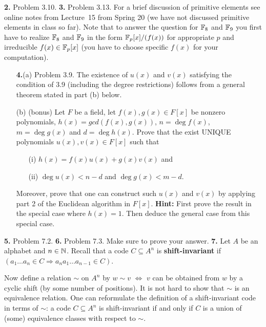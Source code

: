\documentclass[12pt]{amsart}
\begin{document}
\skv
{\bf 2.} Problem 3.10.
\skv
{\bf 3.} Problem 3.13. For a brief discussion of primitive elements see online notes from Lecture~15 from Spring 20 (we have not discussed primitive elements in class so far). Note that to answer the question for ${\mathbb F}_8$ and ${\mathbb F}_9$ you first have to realize ${\mathbb F}_8$ and ${\mathbb F}_9$ in the form ${\mathbb F}_p[x]/(f(x))$
for appropriate $p$ and irreducible $f(x)\in{\mathbb F}_p[x]$ (you have to choose specific $f(x)$ for your computation).
\skv
\begin{itemize}
\item[{\bf 4.}(a)] Problem 3.9. The existence of $u(x)$ and $v(x)$ satisfying the condition of 3.9 (including the degree restrictions) follows from a general
theorem stated in part (b) below.
\item[(b)] (bonus) Let $F$ be a field, let $f(x),g(x)\in F[x]$ be nonzero polynomials,  $h(x)=gcd(f(x),g(x))$, $n=\deg f(x)$, $m=\deg g(x)$ and
$d=\deg h(x)$. Prove that the exist UNIQUE polynomials $u(x),v(x)\in F[x]$ such that 
\begin{itemize}
\item[(i)] $h(x)=f(x)u(x)+g(x)v(x)$ and
\item[(ii)] $\deg u(x)<n-d$ and $\deg g(x)<m-d$.
\end{itemize}
Moreover, prove that one can construct such $u(x)$ and $v(x)$ by applying part 2 of the Euclidean algorithm in $F[x]$. {\bf Hint:}
First prove the result in the special case where $h(x)=1$. Then deduce the general case from this special case.

\end{itemize}
\skv

{\bf 5.} Problem 7.2.
\skv
{\bf 6.} Problem 7.3. Make sure to prove your answer.
\skv
{\bf 7.} Let $A$ be an alphabet and $n\in{\mathbb N}$. Recall that a code $C\subseteq A^n$ is {\bf shift-invariant} if 
$(a_1\ldots a_n\in C \Rightarrow a_n a_1\ldots a_{n-1}\in C)$. 

Now define a relation $\sim$ on $A^n$ by $w\sim v$ $\iff$ $v$ can be obtained from $w$ by a cyclic shift (by some number of positions). It is not hard to show that $\sim$ is an equivalence relation. One can reformulate the definition of a shift-invariant code in terms of $\sim$: a code $C\subseteq A^n$ is shift-invariant if and only if $C$ is a union of (some) equivalence classes with respect to $\sim$.
\end{document}
